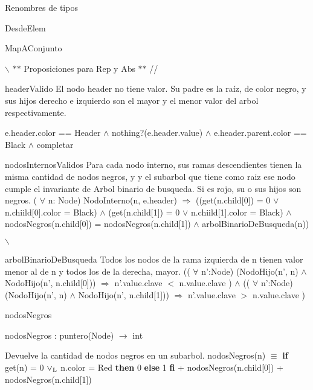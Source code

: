 \begin{DoxyParagraph}{\-Renombres de tipos}
\begin{DoxyParagraph}{\-Desde\-Elem}
\begin{DoxyParagraph}{Map\+A\+Conjunto}
\end{DoxyParagraph}
$\backslash$ $\ast$$\ast$ \-Proposiciones para \-Rep y \-Abs $\ast$$\ast$ //

\begin{DoxyParagraph}{header\-Valido}
\-El nodo header no tiene valor. \-Su padre es la raíz, de color negro, y sus hijos derecho e izquierdo son el mayor y el menor valor del arbol respectivamente.\par
 e.\-header.\-color == \-Header $\land$ nothing?(e.\-header.\-value) $\land$ e.\-header.\-parent.\-color == \-Black $\land$ completar 
\end{DoxyParagraph}
\begin{DoxyParagraph}{nodos\-Internos\-Validos}
\-Para cada nodo interno, sus ramas descendientes tienen la misma cantidad de nodos negros, y y el subarbol que tiene como raiz ese nodo cumple el invariante de \-Arbol binario de busqueda. \-Si es rojo, su o sus hijos son negros. ( $\forall$ n\-: \-Node) \-Nodo\-Interno(n, e.\-header) $\Rightarrow$ ((get(n.\-child\mbox{[}0\mbox{]}) = 0 $\lor$ n.\-chiild\mbox{[}0\mbox{]}.color = \-Black) $\land$ (get(n.\-child\mbox{[}1\mbox{]}) = 0 $\lor$ n.\-chiild\mbox{[}1\mbox{]}.color = \-Black) $\land$ nodos\-Negros(n.\-child\mbox{[}0\mbox{]}) = nodos\-Negros(n.\-child\mbox{[}1\mbox{]}) $\land$ arbol\-Binario\-De\-Busqueda(n)) 
\end{DoxyParagraph}
$\backslash$

\begin{DoxyParagraph}{arbol\-Binario\-De\-Busqueda}
\-Todos los nodos de la rama izquierda de n tienen valor menor al de n y todos los de la derecha, mayor. (( $\forall$ n'\-:\-Node) (\-Nodo\-Hijo(n', n) $\land$ \-Nodo\-Hijo(n', n.\-child\mbox{[}0\mbox{]})) $\Rightarrow$ n'.value.\-clave $<$ n.\-value.\-clave ) $\land$ (( $\forall$ n'\-:\-Node) (\-Nodo\-Hijo(n', n) $\land$ \-Nodo\-Hijo(n', n.\-child\mbox{[}1\mbox{]})) $\Rightarrow$ n'.value.\-clave $>$ n.\-value.\-clave )
\end{DoxyParagraph}
\begin{DoxyParagraph}{nodos\-Negros}

\end{DoxyParagraph}
nodos\-Negros \-: puntero(\-Node) $\to$ int\par
 \-Devuelve la cantidad de nodos negros en un subarbol. nodos\-Negros(n) $\equiv$ {\bfseries if} get(n) = 0 $\lor_{\rm L}$ n.\-color = \-Red {\bfseries then} 0 {\bfseries else} 1 {\bfseries fi} + nodos\-Negros(n.\-child\mbox{[}0\mbox{]}) + nodos\-Negros(n.\-child\mbox{[}1\mbox{]}) 


\end{DoxyParagraph}
\end{DoxyParagraph}
